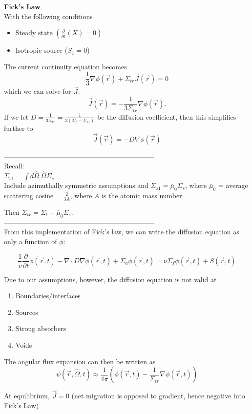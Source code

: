 \documentclass{report}
\newcommand{\p}{\partial}
\newcommand{\ppt}{\frac{\p}{\p t}}
\newcommand{\Xs}{\Sigma}
\newcommand{\Oov}{\frac{1}{v}}
\newcommand{\pos}{\vec{r}}
\newcommand{\cur}{\vec{J}}
\newcommand{\Oh}{\hat{\Omega}}
\newcommand{\rt}{(\pos,t)}
\newcommand{\rOt}{(\pos,\Oh,t)}
\begin{document}
\textbf{Fick's Law}\\

With the following conditions
\begin{itemize}
    \item Steady state $(\ppt(X) = 0)$
    \item Isotropic source ($S_1 = 0$)
\end{itemize}

The current continuity equation becomes
$$\frac{1}{3} \nabla \phi(\pos) + \Xs_{tr} \cur(\pos) = 0$$
which we can solve for $\cur$:
$$\cur(\pos) = -\frac{1}{3\Xs_{tr}} \nabla \phi(\pos).$$
If we let $D = \frac{1}{3\Xs_{tr}} = \frac{1}{3(\Xs_t-\Xs_{s1})}$ be the diffusion coefficient, then this simplifies further to
$$\cur(\pos) = -D \nabla \phi(\pos)$$

------------------------------------------------------------------\\
Recall:\\
$\Xs_{s1} = \int d\Oh \; \Oh \Xs_{s}$\\
Include azimuthally symmetric assumptions and $\Xs_{s1} = \bar{\mu}_0 \Xs_s$, where $\bar{\mu}_0$ = average scattering cosine = $\frac{2}{3A}$, where $A$ is the atomic mass number.

Then $\Xs_{tr} = \Xs_t - \bar{\mu}_0 \Xs_s$.\\
------------------------------------------------------------------\\

From this implementation of Fick's law, we can write the diffusion equation as only a function of $\phi$:

$$\Oov \ppt \phi\rt - \nabla \cdot D \nabla \phi\rt + \Xs_a \phi\rt = \nu\Xs_f \phi\rt + S\rt$$

Due to our assumptions, however, the diffusion equation is not valid at 
\begin{enumerate}
    \item Boundaries/interfaces
    \item Sources
    \item Strong absorbers
    \item Voids
\end{enumerate}

The angular flux expansion can then be written as 
$$\psi\rOt \approx \frac{1}{4\pi}\left( \phi\rt - \frac{1}{\Xs_{tr}} \nabla \phi\rt \right)$$

At equilibrium, $\cur = 0$ (net migration is opposed to gradient, hence negative into Fick's Law)
\end{document}
